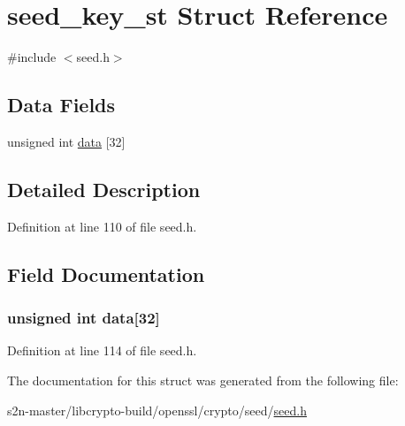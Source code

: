 \hypertarget{structseed__key__st}{}\section{seed\+\_\+key\+\_\+st Struct Reference}
\label{structseed__key__st}


{\ttfamily \#include $<$seed.\+h$>$}

\subsection*{Data Fields}
\begin{DoxyCompactItemize}
\item 
unsigned int \hyperlink{structseed__key__st_aa6ab82c0d598eb64bded55e63defed8d}{data} \mbox{[}32\mbox{]}
\end{DoxyCompactItemize}


\subsection{Detailed Description}


Definition at line 110 of file seed.\+h.



\subsection{Field Documentation}
\subsubsection[{\texorpdfstring{data}{data}}]{\setlength{\rightskip}{0pt plus 5cm}unsigned int data\mbox{[}32\mbox{]}}\hypertarget{structseed__key__st_aa6ab82c0d598eb64bded55e63defed8d}{}\label{structseed__key__st_aa6ab82c0d598eb64bded55e63defed8d}


Definition at line 114 of file seed.\+h.



The documentation for this struct was generated from the following file\+:\begin{DoxyCompactItemize}
\item 
s2n-\/master/libcrypto-\/build/openssl/crypto/seed/\hyperlink{seed_8h}{seed.\+h}\end{DoxyCompactItemize}
